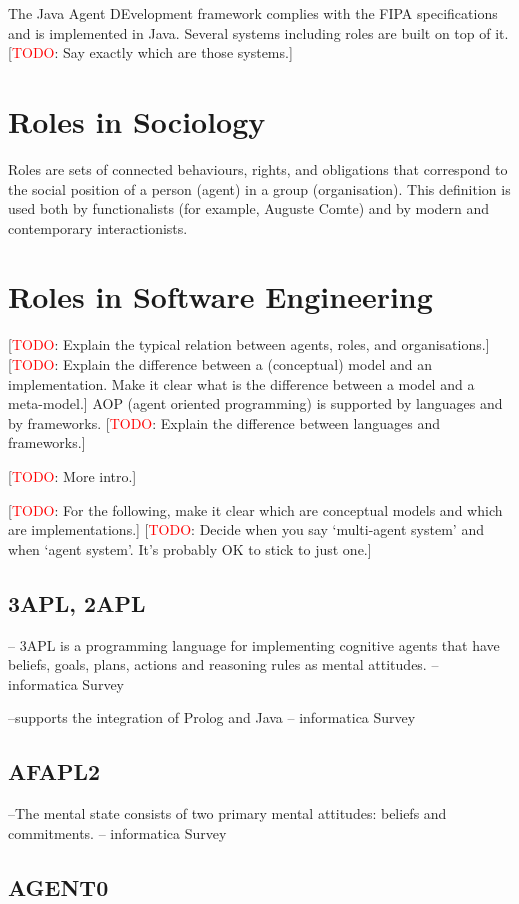 \documentclass{article}
\newcommand{\todo}[1]{[\textcolor{red}{TODO}: #1]}
\begin{document}
The Java Agent DEvelopment framework complies with the FIPA
specifications and is implemented in Java. Several systems
including roles are built on top of it. \todo{Say exactly which
are those systems.}
\section{Roles in Sociology}

Roles are sets of connected behaviours, rights, and obligations
that correspond to the social position of a person (agent) in a
group (organisation). This definition is used both by functionalists
(for example, Auguste Comte) and by modern and contemporary
interactionists.
\section{Roles in Software Engineering}
\label{sec:software_engineering}

\todo{Explain the typical relation between agents, roles, and
  organisations.}
\todo{Explain the difference between a (conceptual) model and an
  implementation. Make it clear what is the difference between a
  model and a meta-model.}
AOP (agent oriented programming) is supported by languages and by
frameworks.  \todo{Explain the difference between languages and
frameworks.}


\todo{More intro.}

\todo{For the following, make it clear which are conceptual models and
  which are implementations.}
\todo{Decide when you say `multi-agent system' and when `agent system'.
  It's probably OK to stick to just one.}

\subsection{3APL, 2APL}
-- 3APL is a programming language for implementing cognitive agents that have 
beliefs, goals, plans, actions and reasoning rules as mental 
attitudes. -- informatica Survey

--supports the integration of Prolog and Java -- informatica Survey
\subsection{AFAPL2}
--The mental state consists of two primary mental attitudes: beliefs and 
commitments. -- informatica Survey
\subsection{AGENT0}
\end{document}
